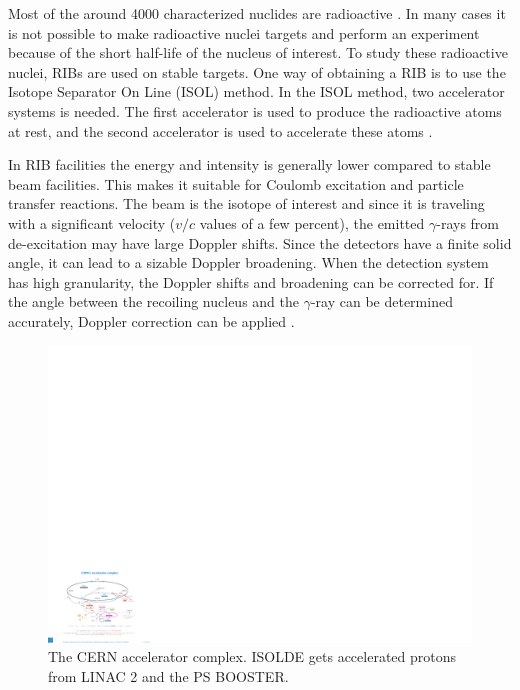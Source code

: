 \documentclass[twoside,english]{uiofysmaster/uiofysmaster}
\newcommand{\ga}{$\gamma$}
\begin{document}
Most of the around 4000 characterized nuclides are radioactive  \cite{CoN}. In many cases it is not possible to make radioactive nuclei targets and perform an experiment because of the short half-life of the nucleus of interest. To study these radioactive nuclei, RIBs are used on stable targets. One way of obtaining a RIB is to use the Isotope Separator On Line (ISOL) method. In the ISOL method, two accelerator systems is needed. The first accelerator is used to produce the radioactive atoms at rest, and the second accelerator is used to accelerate these atoms \cite{ISOL}. 

In RIB facilities the energy and intensity is generally lower compared to stable beam facilities. This makes it suitable for Coulomb excitation and particle transfer reactions. The beam is the isotope of interest and since it is traveling with a significant velocity ($v/c$ values of a few percent), the emitted \ga-rays from de-excitation may have large Doppler shifts. Since the detectors have a finite solid angle, it can lead to a sizable Doppler broadening. When the detection system has high granularity, the Doppler shifts and broadening can be corrected for. If the angle between the recoiling nucleus and the \ga-ray can be determined accurately, Doppler correction can be applied \cite{MB-spect}.


\begin{figure}[ht]
	\centering
	\includegraphics[width=\textwidth]{Images/0812015.pdf}
	\caption{The CERN accelerator complex. ISOLDE gets accelerated protons from LINAC 2 and the PS BOOSTER.}
	\label{fig:accelerators}
\end{figure}
\end{document}
